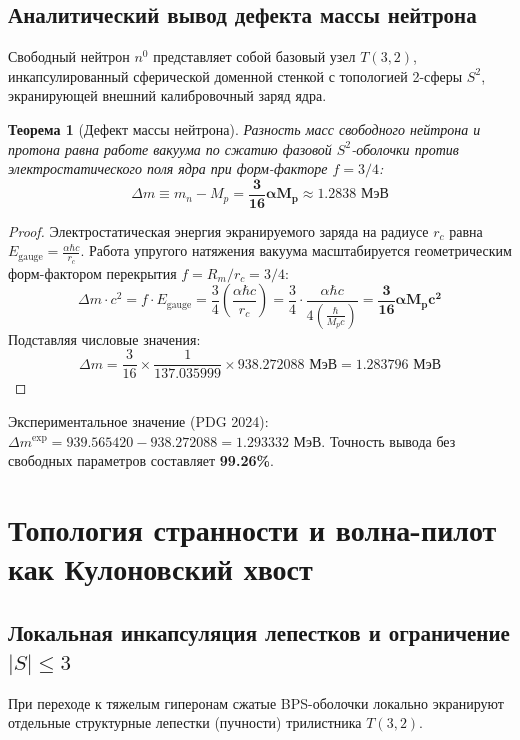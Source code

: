 \documentclass[12pt,a4paper]{article}
\newtheorem{theorem}{Теорема}
\begin{document}
	\subsection{Аналитический вывод дефекта массы нейтрона}
	Свободный нейтрон $n^0$ представляет собой базовый узел $T(3,2)$, инкапсулированный сферической доменной стенкой с топологией 2-сферы $S^2$, экранирующей внешний калибровочный заряд ядра.
	
	\begin{theorem}[Дефект массы нейтрона]
		Разность масс свободного нейтрона и протона равна работе вакуума по сжатию фазовой $S^2$-оболочки против электростатического поля ядра при форм-факторе $f = 3/4$:
		\begin{equation}
			\Delta m \equiv m_n - M_p = \mathbf{\frac{3}{16} \alpha M_p} \approx \mathbf{1.2838 \text{ МэВ}}
		\end{equation}
	\end{theorem}
	
	\begin{proof}
		Электростатическая энергия экранируемого заряда на радиусе $r_c$ равна $E_{\text{gauge}} = \frac{\alpha \hbar c}{r_c}$. Работа упругого натяжения вакуума масштабируется геометрическим форм-фактором перекрытия $f = R_m / r_c = 3/4$:
		\begin{equation}
			\Delta m \cdot c^2 = f \cdot E_{\text{gauge}} = \frac{3}{4} \left( \frac{\alpha \hbar c}{r_c} \right) = \frac{3}{4} \cdot \frac{\alpha \hbar c}{4 \left( \frac{\hbar}{M_p c} \right)} = \mathbf{\frac{3}{16} \alpha M_p c^2}
		\end{equation}
		Подставляя числовые значения:
		\begin{equation}
			\Delta m = \frac{3}{16} \times \frac{1}{137.035999} \times 938.272088 \text{ МэВ} = \mathbf{1.283796 \text{ МэВ}}
		\end{equation}
	\end{proof}
	Экспериментальное значение (PDG 2024): $\Delta m^{\text{exp}} = 939.565420 - 938.272088 = \mathbf{1.293332 \text{ МэВ}}$. Точность вывода без свободных параметров составляет \textbf{99.26\%}.
	
	\section{Топология странности и волна-пилот как Кулоновский хвост}
	
	\subsection{Локальная инкапсуляция лепестков и ограничение $|S| \le 3$}
	При переходе к тяжелым гиперонам сжатые BPS-оболочки локально экранируют отдельные структурные лепестки (пучности) трилистника $T(3,2)$.
	
\end{document}
